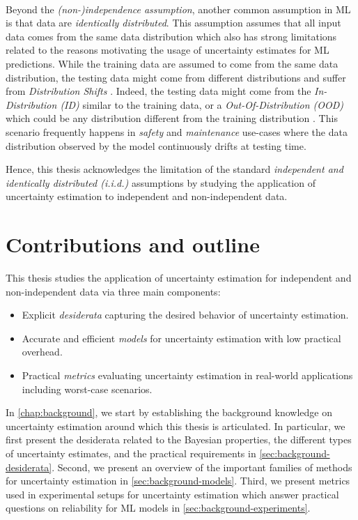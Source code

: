 \paragraph*{} Beyond the \emph{(non-)independence assumption}, another common assumption in ML is that data are \emph{identically distributed}. 
This assumption assumes that all input data comes from the same data distribution which also has strong limitations related to the reasons motivating the usage of uncertainty estimates for ML predictions.
While the training data are assumed to come from the same data distribution, the testing data might come from different distributions and suffer from \emph{Distribution Shifts} \cite{rabanser2019shift, dataset-shift}. 
Indeed, the testing data might come from the \emph{In-Distribution (ID)} similar to the training data, or a \emph{Out-Of-Distribution (OOD)} which could be any distribution different from the training distribution \cite{ood-detection-survey, shen2021ood}.
This scenario frequently happens in \emph{safety} and \emph{maintenance} use-cases where the data distribution observed by the model continuously drifts at testing time. 

Hence, this thesis acknowledges the limitation of the standard \emph{independent and identically distributed (i.i.d.)} assumptions by studying the application of uncertainty estimation to independent and non-independent data.

\section{Contributions and outline}

This thesis studies the application of uncertainty estimation for independent and non-independent data via three main components:
\begin{itemize}
    \item Explicit \emph{desiderata} capturing the desired behavior of uncertainty estimation.
    \item Accurate and efficient \emph{models} for uncertainty estimation with low practical overhead.
    \item Practical \emph{metrics} evaluating uncertainty estimation in real-world applications including worst-case scenarios.
\end{itemize} 

In \cref{chap:background}, we start by establishing the background knowledge on uncertainty estimation around which this thesis is articulated. In particular, we first present the desiderata related to the Bayesian properties, the different types of uncertainty estimates, and the practical requirements in \cref{sec:background-desiderata}. Second, we present an overview of the important families of methods for uncertainty estimation in \cref{sec:background-models}. Third, we present metrics used in experimental setups for uncertainty estimation which answer practical questions on reliability for ML models in \cref{sec:background-experiments}. 

